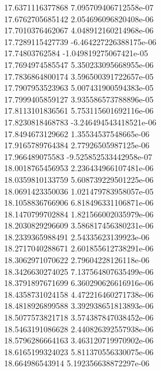 {17.6371116377868 7.095709406712558e-07 \\
17.6762705685142 2.054696096820408e-06 \\
17.7010376462067 4.048912160214968e-06 \\
17.7289115427739 -6.464227226388175e-06 \\
17.74803762584 -1.049819275067421e-05 \\
17.7694974585547 5.350233095668955e-06 \\
17.7836864800174 3.596500391722657e-05 \\
17.7907953523963 5.007431900594383e-05 \\
17.7999405859127 3.935586573788896e-05 \\
17.8113101836561 5.753115601692116e-06 \\
17.8230818468783 -3.246494543418521e-06 \\
17.8494673129662 1.35534537548665e-06 \\
17.9165789764384 2.77926505987125e-06 \\
17.966489075583 -9.525852533442958e-07 \\
18.0018765456953 2.236434966107481e-06 \\
18.0359810133759 5.608739229501225e-06 \\
18.0691423350036 1.021479783958057e-05 \\
18.1058836766906 6.818496331106871e-06 \\
18.1470799702884 1.821566002035979e-06 \\
18.2030829296609 3.586817456380231e-06 \\
18.2339365988491 2.54335623139923e-06 \\
18.2717040288671 2.601855612738291e-06 \\
18.3062971070622 2.79604228126118e-06 \\
18.3426630274025 7.137564807635499e-06 \\
18.3791897671699 6.360290626616916e-06 \\
18.4358731024158 4.472216460271738e-06 \\
18.4818926899588 3.392938651813893e-06 \\
18.5077573821718 3.574387847038452e-06 \\
18.5463191086628 2.440826392557938e-06 \\
18.5796286664163 3.463120719970902e-06 \\
18.6165199324023 5.811370556330075e-06 \\
18.664986543914 5.192356638872297e-06 \\
}
